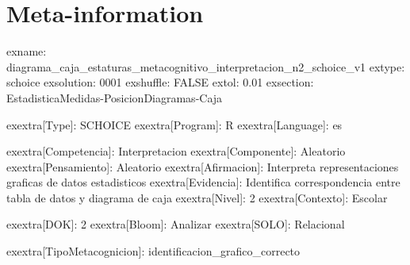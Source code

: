 \documentclass[
]{article}
\begin{document}
\section{Meta-information}\label{meta-information}

exname:
diagrama\_caja\_estaturas\_metacognitivo\_interpretacion\_n2\_schoice\_v1
extype: schoice exsolution: 0001 exshuffle: FALSE extol: 0.01 exsection:
Estadistica\textbar Medidas-Posicion\textbar Diagramas-Caja

exextra{[}Type{]}: SCHOICE exextra{[}Program{]}: R
exextra{[}Language{]}: es

exextra{[}Competencia{]}: Interpretacion exextra{[}Componente{]}:
Aleatorio exextra{[}Pensamiento{]}: Aleatorio exextra{[}Afirmacion{]}:
Interpreta representaciones graficas de datos estadisticos
exextra{[}Evidencia{]}: Identifica correspondencia entre tabla de datos
y diagrama de caja exextra{[}Nivel{]}: 2 exextra{[}Contexto{]}: Escolar

exextra{[}DOK{]}: 2 exextra{[}Bloom{]}: Analizar exextra{[}SOLO{]}:
Relacional

exextra{[}TipoMetacognicion{]}: identificacion\_grafico\_correcto
\end{document}
